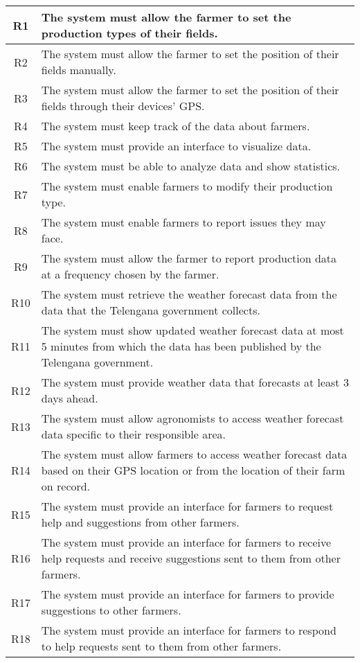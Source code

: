 \begin{longtable}{|c|>{\raggedright\arraybackslash}m{15cm}|}
 
R1	& The system must allow the farmer to set the production types of their fields.\\\hline
R2	& The system must allow the farmer to set the position of their fields manually.\\\hline
R3	& The system must allow the farmer to set the position of their fields through their devices' GPS.\\\hline
R4	& The system must keep track of the data about farmers.\\\hline
R5	& The system must provide an interface to visualize data.\\\hline
R6	& The system must be able to analyze data and show statistics.\\\hline
R7	& The system must enable farmers to modify their production type.\\\hline
R8	& The system must enable farmers to report issues they may face. \\\hline
R9	& The system must allow the farmer to report production data at a frequency chosen by the farmer. \\\hline
R10	& The system must retrieve the weather forecast data from the data that the Telengana government collects.\\\hline
R11	& The system must show updated weather forecast data at most 5 minutes from which the data has been published by the Telengana government.\\\hline
R12	& The system must provide weather data that forecasts at least 3 days ahead.\\\hline
R13	& The system must allow agronomists to access weather forecast data specific to their responsible area.\\\hline
R14	& The system must allow farmers to access weather forecast data based on their GPS location or from the location of their farm on record.\\\hline
R15	& The system must provide an interface for farmers to request help and suggestions from other farmers.\\\hline
R16	& The system must provide an interface for farmers to receive help requests and receive suggestions sent to them from other farmers.\\\hline
R17	& The system must provide an interface for farmers to provide suggestions to other farmers.\\\hline
R18	& The system must provide an interface for farmers to respond to help requests sent to them from other farmers.\\\hline

\end{longtable}
